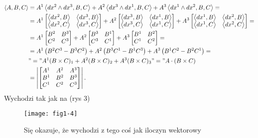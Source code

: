 \documentclass[../main.tex]{subfiles}
\begin{document}
\begin{align*}
    \left<A, B, C \right> &= A^1 \left<dx^2\land dx^3, B, C \right> + A^2\left<dx^3\land dx^1, B, C \right> + A^3 \left<dx^1\land dx^2, B, C \right> = \\
    &= A^1 \begin{bmatrix} \left<dx^2, B \right>& \left<dx^3, B \right>\\ \left<dx^2, C \right>& \left<dx^3, C \right> \end{bmatrix} + A^2 \begin{bmatrix} \left<dx^3, B \right> & \left<dx^1, B \right> \\ \left<dx^3, C \right> & \left<dx^1, C \right> \end{bmatrix} + A^3\begin{bmatrix} \left<dx^1, B \right> & \left<dx^2, B \right> \\ \left<dx^1, C \right> & \left<dx^2, C \right> \end{bmatrix}  =\\
        &= A^1\begin{bmatrix} B^2&B^3\\C^2&C^3 \end{bmatrix} + A^2\begin{bmatrix} B^3&B^1\\C^3&C^1 \end{bmatrix} + A^3\begin{bmatrix} B^1&B^2\\C^1&C^2 \end{bmatrix} =\\
            &=  A^1 \left( B^2C^3 - B^3C^2 \right) + A^2 \left( B^3C^1 - B^1C^3 \right) + A^3 \left( B^1C^2 - B^2C^1 \right) =\\
            &"=" A^1 (B\times C)_1 + A^2(B\times C)_2 + A^3(B\times C)_3 "=" A\cdot (B\times C) \\
            &= \left|\begin{bmatrix} A^1 & A^2 & A^3\\ B^1&B^2&B^3\\ C^1&C^2&C^3 \end{bmatrix}\right|
.\end{align*}
Wychodzi tak jak na (rys 3)\\
\begin{figure}[h]
    \centering
    \texttt{[image: fig1-4]}
    \caption{Się okazuje, że wychodzi z tego coś jak iloczyn wektorowy}
    \label{fig:fig1-4}
\end{figure}
\end{document}
